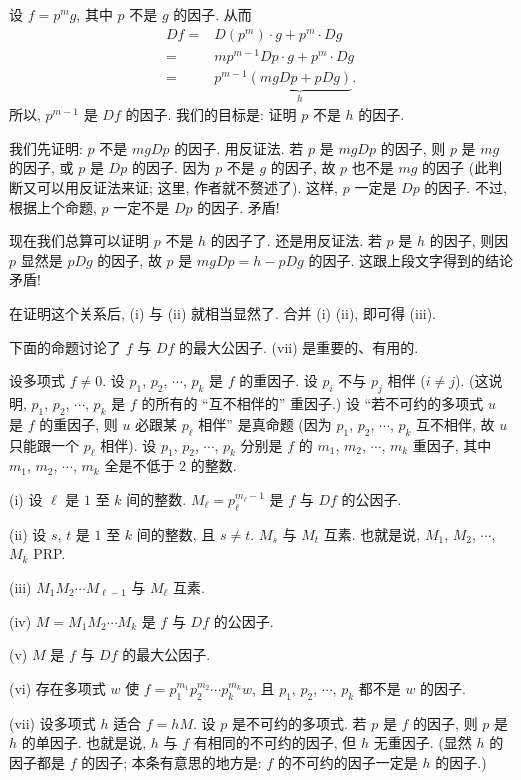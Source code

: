 \begin{pf}
    设 $f = p^m g$, 其中 $p$ 不是 $g$ 的因子. 从而
    \begin{align*}
        Df
        = {} & D(p^m) \cdot g + p^m \cdot Dg          \\
        = {} & mp^{m-1} Dp \cdot g + p^m \cdot Dg     \\
        = {} & p^{m-1} \underbrace{(mgDp + pDg)}_{h}.
    \end{align*}
    所以, $p^{m-1}$ 是 $Df$ 的因子. 我们的目标是: 证明 $p$ 不是 $h$ 的因子.

    我们先证明: $p$ 不是 $mgDp$ 的因子. 用反证法. 若 $p$ 是 $mgDp$ 的因子, 则 $p$ 是 $mg$ 的因子, 或 $p$ 是 $Dp$ 的因子. 因为 $p$ 不是 $g$ 的因子, 故 $p$ 也不是 $mg$ 的因子 (此判断又可以用反证法来证; 这里, 作者就不赘述了). 这样, $p$ 一定是 $Dp$ 的因子. 不过, 根据上个命题, $p$ 一定不是 $Dp$ 的因子. 矛盾!

    现在我们总算可以证明 $p$ 不是 $h$ 的因子了. 还是用反证法. 若 $p$ 是 $h$ 的因子, 则因 $p$ 显然是 $pDg$ 的因子, 故 $p$ 是 $mgDp = h - pDg$ 的因子. 这跟上段文字得到的结论矛盾!

    在证明这个关系后, (i) 与 (ii) 就相当显然了. 合并 (i) (ii), 即可得 (iii).
\end{pf}

下面的命题讨论了 $f$ 与 $Df$ 的最大公因子. (vii) 是重要的、有用的.

\begin{proposition}
    设多项式 $f \neq 0$. 设 $p_1$, $p_2$, $\cdots$, $p_k$ 是 $f$ 的重因子. 设 $p_i$ 不与 $p_j$ 相伴 ($i \neq j$). (这说明, $p_1$, $p_2$, $\cdots$, $p_k$ 是 $f$ 的所有的 ``互不相伴的'' 重因子.) 设 ``若不可约的多项式 $u$ 是 $f$ 的重因子, 则 $u$ 必跟某 $p_\ell$ 相伴'' 是真命题 (因为 $p_1$, $p_2$, $\cdots$, $p_k$ 互不相伴, 故 $u$ 只能跟一个 $p_\ell$ 相伴). 设 $p_1$, $p_2$, $\cdots$, $p_k$ 分别是 $f$ 的 $m_1$, $m_2$, $\cdots$, $m_k$ 重因子, 其中 $m_1$, $m_2$, $\cdots$, $m_k$ 全是不低于 $2$ 的整数.

    (i) 设 $\ell$ 是 $1$ 至 $k$ 间的整数. $M_\ell = p_\ell^{m_\ell - 1}$ 是 $f$ 与 $Df$ 的公因子.

    (ii) 设 $s$, $t$ 是 $1$ 至 $k$ 间的整数, 且 $s \neq t$. $M_s$ 与 $M_t$ 互素. 也就是说, $M_1$, $M_2$, $\cdots$, $M_k$ PRP.

    (iii) $M_1 M_2 \cdots M_{\ell - 1}$ 与 $M_\ell$ 互素.

    (iv) $M = M_1 M_2 \cdots M_k$ 是 $f$ 与 $Df$ 的公因子.

    (v) $M$ 是 $f$ 与 $Df$ 的最大公因子.

    (vi) 存在多项式 $w$ 使 $f = p_1^{m_1} p_2^{m_2} \cdots p_k^{m_k} w$, 且 $p_1$, $p_2$, $\cdots$, $p_k$ 都不是 $w$ 的因子.

    (vii) 设多项式 $h$ 适合 $f = hM$. 设 $p$ 是不可约的多项式. 若 $p$ 是 $f$ 的因子, 则 $p$ 是 $h$ 的单因子. 也就是说, $h$ 与 $f$ 有相同的不可约的因子, 但 $h$ 无重因子. (显然 $h$ 的因子都是 $f$ 的因子; 本条有意思的地方是: $f$ 的不可约的因子一定是 $h$ 的因子.)
\end{proposition}

